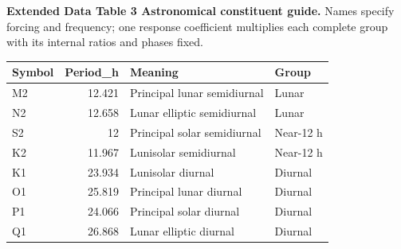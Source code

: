 \documentclass[
  10pt,
  a4paper,
]{article}
\begin{document}
\textbf{Extended Data Table 3 \textbar{} Astronomical constituent
guide.} Names specify forcing and frequency; one response coefficient
multiplies each complete group with its internal ratios and phases
fixed.

\begin{longtable}[]{@{}lrll@{}}
\toprule\noalign{}
Symbol & Period\_h & Meaning & Group \\
\midrule\noalign{}
\endhead
\bottomrule\noalign{}
\endlastfoot
M2 & 12.421 & Principal lunar semidiurnal & Lunar \\
N2 & 12.658 & Lunar elliptic semidiurnal & Lunar \\
S2 & 12 & Principal solar semidiurnal & Near-12 h \\
K2 & 11.967 & Lunisolar semidiurnal & Near-12 h \\
K1 & 23.934 & Lunisolar diurnal & Diurnal \\
O1 & 25.819 & Principal lunar diurnal & Diurnal \\
P1 & 24.066 & Principal solar diurnal & Diurnal \\
Q1 & 26.868 & Lunar elliptic diurnal & Diurnal \\
\end{longtable}
\end{document}

